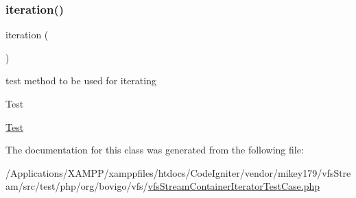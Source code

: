 \subsubsection{\texorpdfstring{iteration()}{iteration()}}
{\footnotesize\ttfamily iteration (\begin{DoxyParamCaption}{ }\end{DoxyParamCaption})}

test method to be used for iterating

\begin{DoxyRefDesc}{Test}
\item[\mbox{\hyperlink{test__test000035}{Test}}]\end{DoxyRefDesc}


The documentation for this class was generated from the following file\+:\begin{DoxyCompactItemize}
\item 
/\+Applications/\+X\+A\+M\+P\+P/xamppfiles/htdocs/\+Code\+Igniter/vendor/mikey179/vfs\+Stream/src/test/php/org/bovigo/vfs/\mbox{\hyperlink{vfs_stream_container_iterator_test_case_8php}{vfs\+Stream\+Container\+Iterator\+Test\+Case.\+php}}\end{DoxyCompactItemize}
